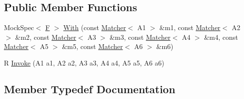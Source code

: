 \subsection*{Public Member Functions}
\begin{DoxyCompactItemize}
\item 
Mock\+Spec$<$ \mbox{\hyperlink{classtesting_1_1internal_1_1FunctionMocker_3_01R_07A1_00_01A2_00_01A3_00_01A4_00_01A5_00_01A6_08_4_a5373cd66051f0a54e83b0497004df058}{F}} $>$ \mbox{\hyperlink{classtesting_1_1internal_1_1FunctionMocker_3_01R_07A1_00_01A2_00_01A3_00_01A4_00_01A5_00_01A6_08_4_a5aaa2bc19a6180f55eee2cc1e0dfa939}{With}} (const \mbox{\hyperlink{classtesting_1_1Matcher}{Matcher}}$<$ A1 $>$ \&m1, const \mbox{\hyperlink{classtesting_1_1Matcher}{Matcher}}$<$ A2 $>$ \&m2, const \mbox{\hyperlink{classtesting_1_1Matcher}{Matcher}}$<$ A3 $>$ \&m3, const \mbox{\hyperlink{classtesting_1_1Matcher}{Matcher}}$<$ A4 $>$ \&m4, const \mbox{\hyperlink{classtesting_1_1Matcher}{Matcher}}$<$ A5 $>$ \&m5, const \mbox{\hyperlink{classtesting_1_1Matcher}{Matcher}}$<$ A6 $>$ \&m6)
\item 
R \mbox{\hyperlink{classtesting_1_1internal_1_1FunctionMocker_3_01R_07A1_00_01A2_00_01A3_00_01A4_00_01A5_00_01A6_08_4_a8499277f15101fefacbb0c9d93b8153b}{Invoke}} (A1 a1, A2 a2, A3 a3, A4 a4, A5 a5, A6 a6)
\end{DoxyCompactItemize}


\subsection{Member Typedef Documentation}
\mbox{\label{classtesting_1_1internal_1_1FunctionMocker_3_01R_07A1_00_01A2_00_01A3_00_01A4_00_01A5_00_01A6_08_4_a0c8bc671adc8e67e8a49a01432407139}} 
